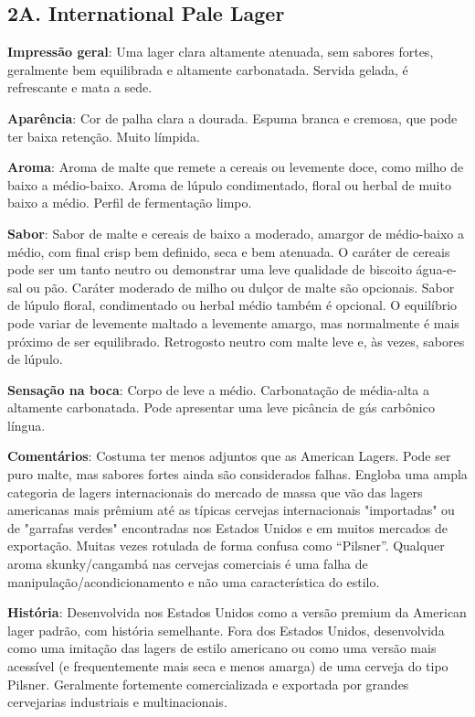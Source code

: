 \subsection*{2A. International Pale Lager}

\textbf{Impressão geral}: Uma lager clara altamente atenuada, sem sabores fortes, geralmente bem equilibrada e altamente carbonatada. Servida gelada, é refrescante e mata a sede.

\textbf{Aparência}: Cor de palha clara a dourada. Espuma branca e cremosa, que pode ter baixa retenção. Muito límpida.

\textbf{Aroma}: Aroma de malte que remete a cereais ou levemente doce, como milho de baixo a médio-baixo. Aroma de lúpulo condimentado, floral ou herbal de muito baixo a médio. Perfil de fermentação limpo.

\textbf{Sabor}: Sabor de malte e cereais de baixo a moderado, amargor de médio-baixo a médio, com final crisp bem definido, seca e bem atenuada. O caráter de cereais pode ser um tanto neutro ou demonstrar uma leve qualidade de biscoito água-e-sal ou pão. Caráter moderado de milho ou dulçor de malte são opcionais. Sabor de lúpulo floral, condimentado ou herbal médio também é opcional. O equilíbrio pode variar de levemente maltado a levemente amargo, mas normalmente é mais próximo de ser equilibrado. Retrogosto neutro com malte leve e, às vezes, sabores de lúpulo.

\textbf{Sensação na boca}: Corpo de leve a médio. Carbonatação de média-alta a altamente carbonatada. Pode apresentar uma leve picância de gás carbônico língua.

\textbf{Comentários}: Costuma ter menos adjuntos que as American Lagers. Pode ser puro malte, mas sabores fortes ainda são considerados falhas. Engloba uma ampla categoria de lagers internacionais do mercado de massa que vão das lagers americanas mais prêmium até as típicas cervejas internacionais "importadas" ou de "garrafas verdes" encontradas nos Estados Unidos e em muitos mercados de exportação. Muitas vezes rotulada de forma confusa como “Pilsner”. Qualquer aroma skunky/cangambá nas cervejas comerciais é uma falha de manipulação/acondicionamento e não uma característica do estilo.

\textbf{História}: Desenvolvida nos Estados Unidos como a versão premium da American lager padrão, com história semelhante. Fora dos Estados Unidos, desenvolvida como uma imitação das lagers de estilo americano ou como uma versão mais acessível (e frequentemente mais seca e menos amarga) de uma cerveja do tipo Pilsner. Geralmente fortemente comercializada e exportada por grandes cervejarias industriais e multinacionais.

